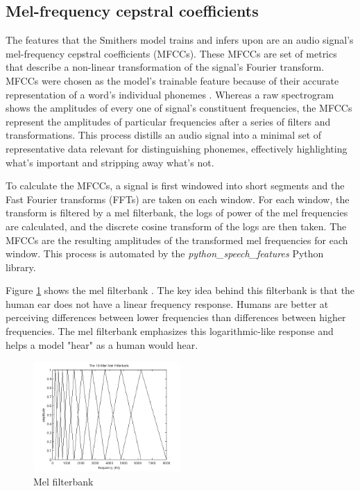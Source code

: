 \documentclass[conference]{IEEEtran}
\begin{document}
\subsection{Mel-frequency cepstral coefficients} \label{sec:mfcc}
The features that the Smithers model trains and infers upon 
are an audio signal's mel-frequency cepstral coefficients (MFCCs).
These MFCCs are set of metrics that describe a non-linear transformation of the signal's Fourier transform.
MFCCs were chosen as the model's trainable feature because of their accurate representation
of a word's individual phonemes \cite{lyons}.
Whereas a raw spectrogram shows the amplitudes of every one of signal's constituent frequencies,
the MFCCs represent the amplitudes of particular frequencies after a series of filters and transformations.
This process distills an audio signal into a minimal set of representative data relevant for distinguishing phonemes, 
effectively highlighting what's important and stripping away what's not.

To calculate the MFCCs, a signal is first windowed into short segments
and the Fast Fourier transforms (FFTs) are taken on each window.
For each window, the transform is filtered by a mel filterbank,
the logs of power of the mel frequencies are calculated,
and the discrete cosine transform of the logs are then taken.
The MFCCs are the resulting amplitudes of the transformed mel frequencies for each window.
This process is automated by the \textit{python\_speech\_features} Python library.

Figure \ref{fig:filterbank} shows the mel filterbank \cite{lyons}.
The key idea behind this filterbank is that the human ear does not have a linear frequency response.
Humans are better at perceiving differences between lower frequencies
than differences between higher frequencies.
The mel filterbank emphasizes this logarithmic-like response and helps a model "hear" as a human would hear.

\begin{figure}[htbp]
    \centerline{\includegraphics[width=0.5\textwidth]{figs/filterbank.png}}
    \caption{Mel filterbank \cite{lyons}}
    \label{fig:filterbank}
\end{figure}
\end{document}
